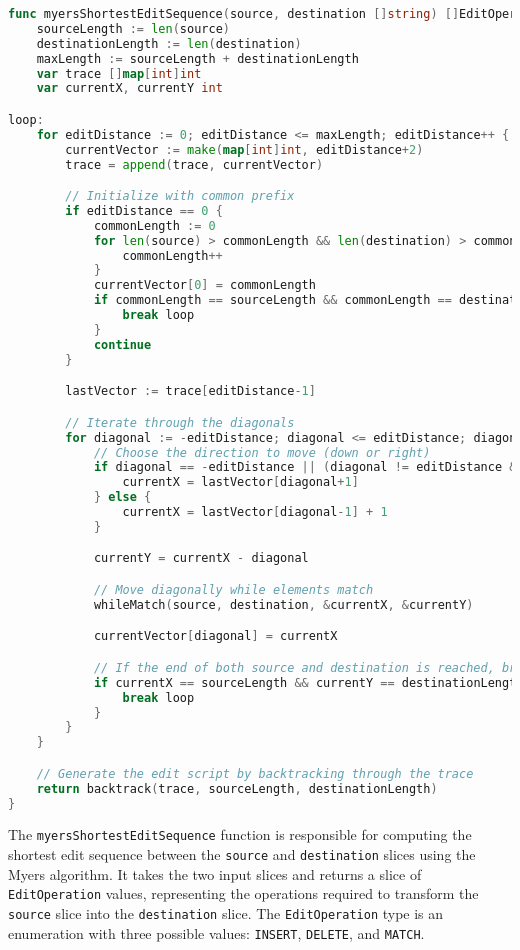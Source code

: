 \begin{lstlisting}[language=go]
func myersShortestEditSequence(source, destination []string) []EditOperation {
	sourceLength := len(source)
	destinationLength := len(destination)
	maxLength := sourceLength + destinationLength
	var trace []map[int]int
	var currentX, currentY int

loop:
	for editDistance := 0; editDistance <= maxLength; editDistance++ {
		currentVector := make(map[int]int, editDistance+2)
		trace = append(trace, currentVector)

		// Initialize with common prefix
		if editDistance == 0 {
			commonLength := 0
			for len(source) > commonLength && len(destination) > commonLength && source[commonLength] == destination[commonLength] {
				commonLength++
			}
			currentVector[0] = commonLength
			if commonLength == sourceLength && commonLength == destinationLength {
				break loop
			}
			continue
		}

		lastVector := trace[editDistance-1]

		// Iterate through the diagonals
		for diagonal := -editDistance; diagonal <= editDistance; diagonal += 2 {
			// Choose the direction to move (down or right)
			if diagonal == -editDistance || (diagonal != editDistance && lastVector[diagonal-1] < lastVector[diagonal+1]) {
				currentX = lastVector[diagonal+1]
			} else {
				currentX = lastVector[diagonal-1] + 1
			}

			currentY = currentX - diagonal

			// Move diagonally while elements match
			whileMatch(source, destination, &currentX, &currentY)

			currentVector[diagonal] = currentX

			// If the end of both source and destination is reached, break the loop
			if currentX == sourceLength && currentY == destinationLength {
				break loop
			}
		}
	}

	// Generate the edit script by backtracking through the trace
	return backtrack(trace, sourceLength, destinationLength)
}
\end{lstlisting}
\medskip

The \lstinline{myersShortestEditSequence} function is responsible for computing the shortest edit sequence between the \lstinline{source} and \lstinline{destination} slices using the Myers algorithm. It takes the two input slices and returns a slice of \lstinline{EditOperation} values, representing the operations required to transform the \lstinline{source} slice into the \lstinline{destination} slice. The \lstinline{EditOperation} type is an enumeration with three possible values: \lstinline{INSERT}, \lstinline{DELETE}, and \lstinline{MATCH}.


